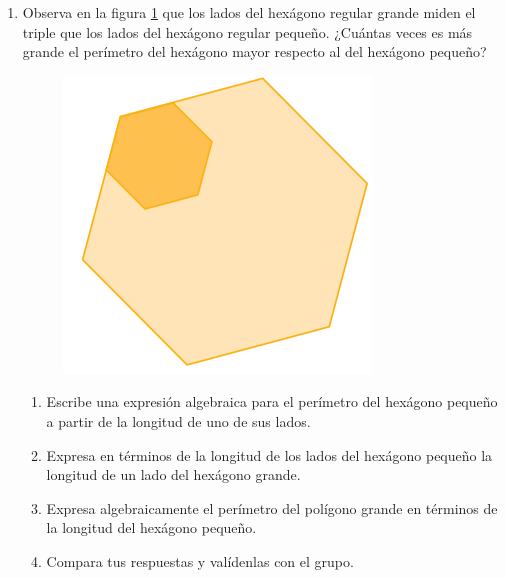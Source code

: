 \documentclass[11pt]{book}
\begin{document}
\begin{enumerate}
  \item Observa en la figura \ref{fig:hexagon} que los lados del hexágono regular grande miden el triple
        que los lados del hexágono regular pequeño. ¿Cuántas veces es más grande el perímetro del
        hexágono mayor respecto al del hexágono pequeño?

        \begin{minipage}{0.25\textwidth}
          \begin{figure}[H]
            \centering
            \includegraphics[width=\linewidth]{hexagon.png}
            \label{fig:hexagon}
          \end{figure}
        \end{minipage}\hfill
        \begin{minipage}{0.65\textwidth}
          \begin{enumerate}
            \item Escribe una expresión algebraica para el perímetro del hexágono pequeño a partir de la longitud de uno de sus lados.
            \item Expresa en términos de la longitud de los lados del hexágono pequeño la longitud de un lado del hexágono grande.
            \item Expresa algebraicamente el perímetro del polígono grande en términos de la longitud del hexágono pequeño.
            \item Compara tus respuestas y valídenlas con el grupo.
          \end{enumerate}
        \end{minipage}


\end{enumerate}
\end{document}
